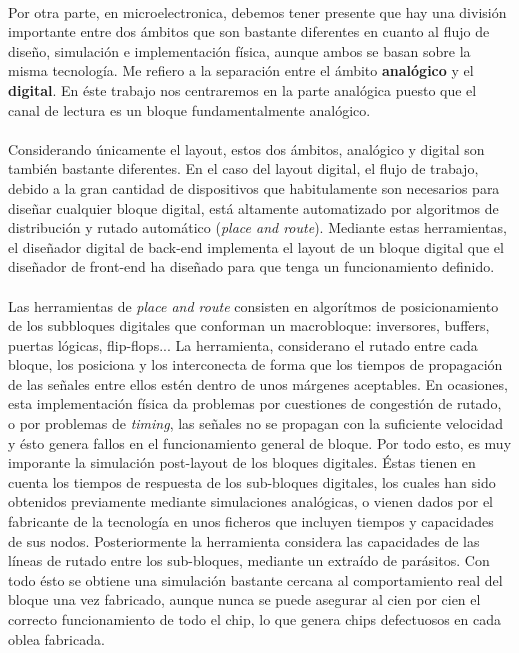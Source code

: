 \paragraph{} Por otra parte, en microelectronica, debemos tener presente que
hay una división importante entre dos ámbitos que son bastante diferentes en cuanto
al flujo de diseño, simulación e implementación física, aunque ambos se basan sobre
la misma tecnología. Me refiero a la separación entre el ámbito \textbf{analógico}
y el \textbf{digital}. En éste trabajo nos centraremos en la parte analógica
puesto que el canal de lectura es un bloque fundamentalmente analógico.

\paragraph{} Considerando únicamente el layout, estos dos ámbitos, analógico y
digital son también bastante diferentes. En el caso del layout digital, el flujo
de trabajo, debido a la gran cantidad de dispositivos que habitulamente son necesarios
para diseñar cualquier bloque digital, está altamente automatizado por algoritmos
de distribución y rutado automático (\textit{place and route}). Mediante estas
herramientas, el diseñador digital de back-end implementa el layout de un bloque
digital que el diseñador de front-end ha diseñado para que tenga un funcionamiento
definido.

\paragraph{} Las herramientas de \textit{place and route} consisten en algorítmos
de posicionamiento de los subbloques digitales que conforman un macrobloque:
inversores, buffers, puertas lógicas, flip-flops... La herramienta, considerano el
rutado entre cada bloque, los posiciona y los interconecta de forma que los tiempos
de propagación de las señales entre ellos estén dentro de unos márgenes aceptables.
En ocasiones, esta implementación física da problemas por cuestiones de congestión
de rutado, o por problemas de \textit{timing}, las señales no se propagan con la
suficiente velocidad y ésto genera fallos en el funcionamiento general de bloque.
Por todo esto, es muy imporante la simulación post-layout de los bloques digitales.
Éstas tienen en cuenta los tiempos de respuesta de los sub-bloques digitales, los cuales
han sido obtenidos previamente mediante simulaciones analógicas, o vienen dados por
el fabricante de la tecnología en unos ficheros que incluyen tiempos y capacidades de
sus nodos. Posteriormente la herramienta considera las capacidades de las líneas de
rutado entre los sub-bloques, mediante un extraído de parásitos. Con todo ésto
se obtiene una simulación bastante cercana al comportamiento real del bloque una vez
fabricado, aunque nunca se puede asegurar al cien por cien el correcto funcionamiento
de todo el chip, lo que genera chips defectuosos en cada oblea fabricada.


